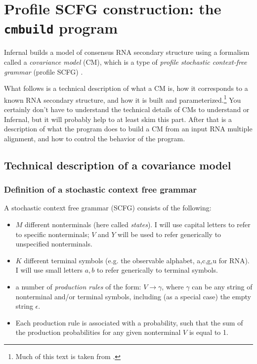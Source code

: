 \section{Profile SCFG construction: the \texttt{cmbuild} program}
\label{section:cmbuild}
\setcounter{footnote}{0}

Infernal builds a model of consensus RNA secondary
structure using a formalism called a \emph{covariance model} (CM),
which is a type of \emph{profile stochastic context-free grammar}
(profile SCFG) \cite{Eddy94,Durbin98,Eddy02b}.

What follows is a technical description of what a CM is, how it
corresponds to a known RNA secondary structure, and how it is built
and parameterized.\footnote{Much of this text is taken from
\cite{Eddy02b}.}  You certainly don't have to understand the technical
details of CMs to understand  or Infernal,
but it will probably help to at least skim this part. After that is a
description of what the  program does to build a CM from
an input RNA multiple alignment, and how to control the behavior of
the program.

\subsection{Technical description of a covariance model}

\subsubsection{Definition of a stochastic context free grammar}

A stochastic context free grammar (SCFG) consists of the following:

\begin{itemize}
\item $M$ different nonterminals (here called \emph{states}). I will use capital
      letters to refer to specific nonterminals; $V$ and $Y$ will be used
      to refer generically to unspecified nonterminals.
\item $K$ different terminal symbols (e.g. the observable alphabet,
      {a,c,g,u} for RNA). I will use small letters $a,b$ to refer
      generically to terminal symbols.
\item a number of \emph{production rules} of the form: $V \rightarrow
\gamma$, where $\gamma$ can be any string of nonterminal and/or
terminal symbols, including (as a special case) the empty string
$\epsilon$.
\item Each production rule is associated with a probability, such that
      the sum of the production probabilities for any given
      nonterminal $V$ is equal to 1.
\end{itemize} 

